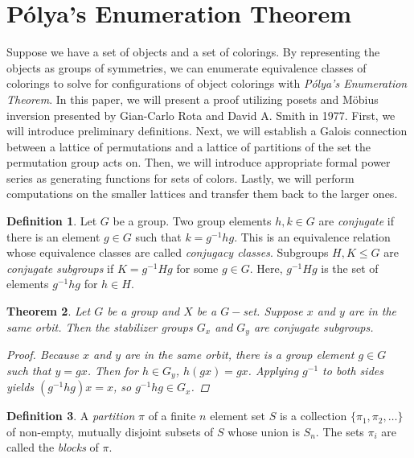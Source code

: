 \documentclass[psamsfonts]{amsart}
\newtheorem{thm}{Theorem}[section]
\theoremstyle{definition}
\newtheorem{defn}[thm]{Definition}
\theoremstyle{remark}
\numberwithin{equation}{section}
\begin{document}
\section{P\'{o}lya's Enumeration Theorem}
\indent Suppose we have a set of objects and a set of colorings. By representing the objects as groups of symmetries, we can enumerate equivalence classes of colorings to solve for configurations of object colorings with \textit{P\'{o}lya's Enumeration Theorem}. In this paper, we will present a proof  utilizing posets and M\"{o}bius inversion presented by Gian-Carlo Rota and David A. Smith in 1977\cite{Polya}. First, we will introduce preliminary definitions. Next, we will establish a Galois connection between a lattice of permutations and a lattice of partitions of the set the permutation group acts on. Then, we will introduce appropriate formal power series as generating functions for sets of colors. Lastly, we will perform computations on the smaller lattices and transfer them back to the larger ones. 


\begin{defn}
Let $G$ be a group. Two group elements $h,k\in G$ are \textit{conjugate} if there is an element $g\in G$ such that $k=g^{-1}hg$. This is an equivalence relation whose equivalence classes are called \textit{conjugacy classes}. Subgroups $H,K\leq G$ are \textit{conjugate subgroups} if $K=g^{-1}Hg$ for some $g\in G$. Here, $g^{-1}Hg$ is the set of elements $g^{-1}hg$ for $h\in H$. 
\end{defn}

\begin{thm}\label{conjugate subgroup orbits}
Let $G$ be a group and $X$ be a $G-$set. Suppose $x$ and $y$ are in the same orbit. Then the stabilizer groups $G_x$ and $G_y$ are conjugate subgroups. 
\begin{proof}
Because $x$ and $y$ are in the same orbit, there is a group element $g\in G$ such that $y=gx$. Then for $h\in G_y$, $h(gx)=gx$. Applying $g^{-1}$ to both sides yields $(g^{-1}hg)x=x$, so $g^{-1}hg\in G_x$. 
\end{proof}
\end{thm}

\begin{defn}
A \textit{partition} $\pi$ of a finite $n$ element set $S$ is a collection $\{\pi_1,\pi_2,\dots\}$ of non-empty, mutually disjoint subsets of $S$ whose union is $S_n$. The sets $\pi_i$ are called the \textit{blocks} of $\pi$. 
\end{defn}
\end{document}
